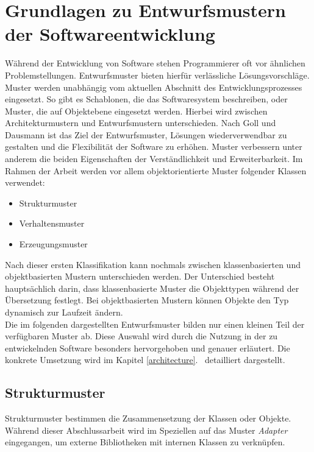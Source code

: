 \chapter{Grundlagen zu Entwurfsmustern der Softwareentwicklung} \label{swa}

Während der Entwicklung von Software stehen Programmierer oft vor ähnlichen Problemstellungen. Entwurfsmuster bieten hierfür verlässliche Lösungsvorschläge\cite{goll:swa}. Muster werden unabhängig vom aktuellen Abschnitt des Entwicklungsprozesses eingesetzt. So gibt es Schablonen, die das Softwaresystem beschreiben, oder Muster, die auf Objektebene eingesetzt werden. Hierbei wird zwischen Architekturmustern und Entwurfsmustern unterschieden. Nach Goll und Dausmann \cite[3.1, 3.2]{goll:swa} ist das Ziel der Entwurfsmuster, Lösungen wiederverwendbar zu gestalten und die Flexibilität der Software zu erhöhen. Muster verbessern unter anderem die beiden Eigenschaften der Verständlichkeit und Erweiterbarkeit. Im Rahmen der Arbeit werden vor allem objektorientierte Muster folgender Klassen verwendet:

\begin{itemize}
\item Strukturmuster
\item Verhaltensmuster
\item Erzeugungsmuster
\end{itemize}

Nach dieser ersten Klassifikation kann nochmals zwischen klassenbasierten und objektbasierten Mustern unterschieden werden. Der Unterschied besteht hauptsächlich darin, dass klassenbasierte Muster die Objekttypen während der Übersetzung festlegt. Bei objektbasierten Mustern können Objekte den  Typ dynamisch zur Laufzeit ändern\cite[4.1]{goll:swa}.\\
Die im folgenden dargestellten Entwurfsmuster bilden nur einen kleinen Teil der verfügbaren Muster ab. Diese Auswahl wird durch die Nutzung in der zu entwickelnden Software besonders hervorgehoben und genauer erläutert. Die konkrete Umsetzung wird im Kapitel \glqq \ref{architecture}.  \grqq\ detailliert dargestellt.

\section{Strukturmuster}
Strukturmuster bestimmen die Zusammensetzung der Klassen oder Objekte. Während dieser Abschlussarbeit wird im Speziellen auf das Muster \textit{Adapter} eingegangen, um externe Bibliotheken mit internen Klassen zu verknüpfen.


